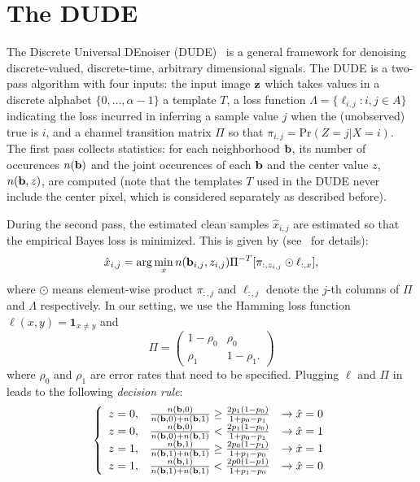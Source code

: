 \documentclass{article}
\begin{document}
\section{The DUDE} 
\label{sec:bdude}
\def\Pr{\ensuremath{\mathrm{Pr}}}
\def\ti{^{-T}}
The Discrete Universal DEnoiser (DUDE)~\cite{dude} is a general framework for denoising discrete-valued, discrete-time, arbitrary dimensional signals. The DUDE is a two-pass algorithm with four inputs: the input image $\vz$ which takes values in a discrete alphabet $\{0,\ldots,\alpha-1\}$ a template $T$, a loss function $\Lambda=\{\ell_{i,j}:i,j \in A\}$ indicating the loss incurred in inferring a sample value $j$ when the (unobserved) true is $i$, and a channel transition matrix $\Pi$ so that $\pi_{i,j}=\Pr(Z=j|X=i)$. The first pass collects  statistics: for each neighborhood $\vb$, its number of occurences $n(\vb)$ and the joint occurences of each $\vb$ and the center value $z$, $n(\vb,z)$, are computed (note that the templates $T$ used in the DUDE never include the center pixel, which is considered separately as described before).

During the second pass, the estimated clean samples $\hat{x}_{i,j}$ are estimated so that the empirical Bayes loss is minimized. This is given by (see~\cite{dude} for details):
\begin{equation}
\hat x_{i,j} = \arg\min_x n(\vb_{i,j},z_{i,j}) \Pi\ti [\pi_{:,z_{i,j}} \odot \ell_{:,x} ],  \label{eq:dude}
\end{equation}
where $\odot$ means element-wise product  $\pi_{:,j}$ and $\ell_{:,j}$ denote the $j$-th columns of $\Pi$ and $\Lambda$ respectively.
In our setting, we use the Hamming loss function $\ell(x,y)=\mathbf{1}_{x \neq y}$ and 
$$
\Pi = \left(\begin{array}{cc}
1-\rho_{0}     & \rho_{0} \\
\rho_1      & 1-\rho_{1}.
\end{array}\right)
$$
where $\rho_0$ and $\rho_1$ are error rates that need to be specified. Plugging $\ell$ and $\Pi$ in  leads to the following \emph{decision rule}:
\begin{equation}
    \left\{
    \begin{array}{ccc}
        z=0,&\frac{n(\vb,0)}{n(\vb,0)+n(\vb,1)} \geq \frac{2p_1(1-p_0)}{1+p_0-p_1}&\rightarrow \hx = 0\\
        z=0,&\frac{n(\vb,0)}{n(\vb,0)+n(\vb,1)} < \frac{2p_1(1-p_0)}{1+p_0-p_1}&\rightarrow \hx = 1\\        
        z=1,&\frac{n(\vb,1)}{n(\vb,1)+n(\vb,1)} \geq \frac{2p_0(1-p_1)}{1+p_1-p_0}&\rightarrow \hx = 1\\        z=1,&\frac{n(\vb,1)}{n(\vb,1)+n(\vb,1)} < \frac{2p0(1-p1)}{1+p_1-p_0}&\rightarrow \hx = 0\\        \end{array}
    \right.
\end{equation}
\end{document}
